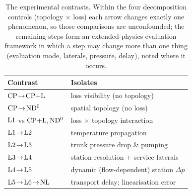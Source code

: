 \begin{table}[t]
\centering
\caption{The experimental contrasts. Within the four decomposition controls (topology
$\times$ loss) each arrow changes exactly one phenomenon, so those comparisons are unconfounded;
the remaining steps form an extended-physics evaluation framework in which a step may change
more than one thing (evaluation mode, laterals, pressure, delay), noted where it occurs.}
\label{tab:contrasts}
\begin{tabular}{ll}
\hline
Contrast & Isolates \\
\hline
$\mathrm{CP}\!\to\!\mathrm{CP{+}L}$ & loss visibility (no topology) \\
$\mathrm{CP}\!\to\!\mathrm{ND^{0}}$ & spatial topology (no loss) \\
$\mathrm{L1}$ vs $\mathrm{CP{+}L},\mathrm{ND^{0}}$ & loss $\times$ topology interaction \\
$\mathrm{L1}\!\to\!\mathrm{L2}$ & temperature propagation \\
$\mathrm{L2}\!\to\!\mathrm{L3}$ & trunk pressure drop \& pumping \\
$\mathrm{L3}\!\to\!\mathrm{L4}$ & station resolution + service laterals \\
$\mathrm{L4}\!\to\!\mathrm{L5}$ & dynamic (flow-dependent) station $\Delta p$ \\
$\mathrm{L5}\!\to\!\mathrm{L6}\!\to\!\mathrm{NL}$ & transport delay; linearisation error \\
\hline
\end{tabular}
\end{table}

